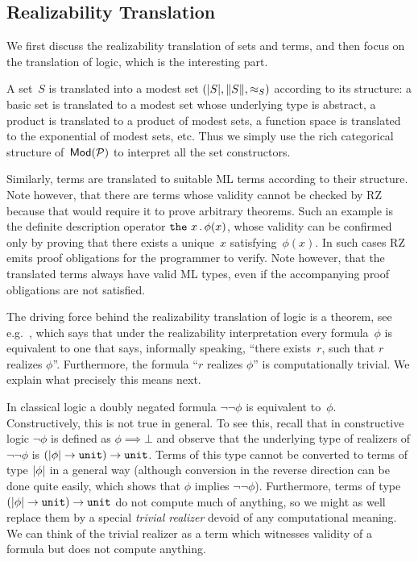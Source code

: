 \subsection{Realizability Translation}
\label{subsec:real-transl}

We first discuss the realizability translation of sets and terms, and
then focus on the translation of logic, which is the interesting part.

A set~$S$ is translated into a modest set $(|S|, \|S\|,
{\approx_{S}})$ according to its structure: a basic set is translated to a
modest set whose underlying type is abstract, a product is translated
to a product of modest sets, a function space is translated to the
exponential of modest sets, etc. Thus we simply use the rich
categorical structure of~$\mathsf{Mod}(\mathcal{P})$ to interpret all the set
constructors.

Similarly, terms are translated to suitable ML terms according to
their structure. Note however, that there are terms whose validity
cannot be checked by RZ because that would require it to prove
arbitrary theorems. Such an example is the definite description
operator $\mbox{\texttt{the}}\ x \,.\, \phi(x)$, whose validity can be confirmed only
by proving that there exists a unique~$x$ satisfying~$\phi(x)$. In
such cases RZ emits proof obligations for the programmer to verify.
Note however, that the translated terms always have valid ML types,
even if the accompanying proof obligations are not satisfied.

The driving force behind the realizability translation of logic is a
theorem, see e.g.\ \cite[Thm.~4.4.10]{Troelstra:van-Dalen:88:1}, which
says that under the realizability interpretation every formula~$\phi$
is equivalent to one that says, informally speaking, ``there
exists~$r$, such that $r$ realizes $\phi$''. Furthermore, the formula
``$r$ realizes $\phi$'' is computationally trivial. We explain what
precisely this means next.

In classical logic a doubly negated formula $\lnot\lnot\phi$ is
equivalent to~$\phi$. Constructively, this is not true in general. To
see this, recall that in constructive logic $\lnot\phi$ is defined as
$\phi \implies \bot$ and observe that the underlying type of realizers
of $\lnot\lnot\phi$ is $(|\phi| \to \mathtt{unit}) \to
\mathtt{unit}$. Terms of this type cannot be converted to terms of
type $|\phi|$ in a general way (although conversion in the reverse
direction can be done quite easily, which shows that $\phi$ implies
$\lnot\lnot\phi$). Furthermore, terms of type $(|\phi| \to
\mathtt{unit}) \to \mathtt{unit}$ do not compute much of anything, so
we might as well replace them by a special \emph{trivial realizer}
devoid of any computational meaning. We can think of the trivial
realizer as a term which witnesses validity of a formula but does not
compute anything.

